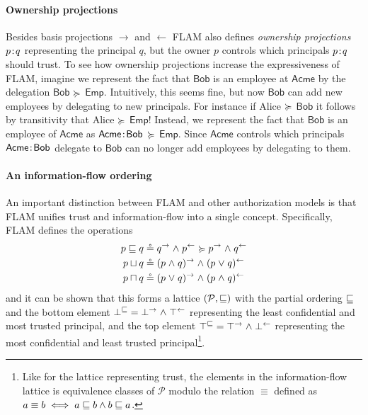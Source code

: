 \paragraph{Ownership projections}
Besides basis projections $\rightarrow$ and $\leftarrow$ FLAM also defines \emph{ownership projections} $p\!:\!q$ representing the principal $q$, but the owner $p$ controls which principals $p\!:\!q$ should trust. To see how ownership projections increase the expressiveness of FLAM, imagine we represent the fact that $\mathsf{Bob}$ is an employee at $\mathsf{Acme}$ by the delegation $\mathsf{Bob}$ $\succcurlyeq$ $\mathsf{Emp}$. Intuitively, this seems fine, but now $\mathsf{Bob}$ can add new employees by delegating to new principals. For instance if Alice $\succcurlyeq$ $\mathsf{Bob}$ it follows by transitivity that Alice $\succcurlyeq$ $\mathsf{Emp}$! Instead, we represent the fact that $\mathsf{Bob}$ is an employee of $\mathsf{Acme}$ as $\mathsf{Acme}\!:\!\mathsf{Bob}$ $\succcurlyeq$ $\mathsf{Emp}$. Since $\mathsf{Acme}$ controls which principals $\mathsf{Acme}\!:\!\mathsf{Bob}$ delegate to $\mathsf{Bob}$ can no longer add employees by delegating to them.

\paragraph{An information-flow ordering}
An important distinction between FLAM and other authorization models is that FLAM unifies trust and information-flow into a single concept. Specifically, FLAM defines the operations
\begin{align*}
p \sqsubseteq q &\circeq q^{\rightarrow} \mathrel{\land} p^{\leftarrow} \succcurlyeq p^{\rightarrow} \mathrel{\land} q^{\leftarrow}\\
p \sqcup q &\circeq (p \mathrel{\land} q)^{\rightarrow} \mathrel{\land} (p \mathrel{\lor} q)^{\leftarrow} \\
p \sqcap q &\circeq (p \mathrel{\lor} q)^{\rightarrow} \mathrel{\land} (p \mathrel{\land} q)^{\leftarrow}
\end{align*}
and it can be shown that this forms a lattice $(\mathcal{P}, \sqsubseteq)$ with the partial ordering $\sqsubseteq$ and the bottom element $\bot^{\sqsubseteq} = \bot^{\rightarrow} \mathrel{\land} \top^{\leftarrow}$ representing the least confidential and most trusted principal, and the top element $\top^{\sqsubseteq} = \top^{\rightarrow} \mathrel{\land} \bot^{\leftarrow}$ representing the most confidential and least trusted principal\footnote{Like for the lattice representing trust, the elements in the information-flow lattice is equivalence classes of $\mathcal{P}$ modulo the relation $\equiv$ defined as $a \equiv b \iff a \sqsubseteq b \wedge b \sqsubseteq a$.}.

